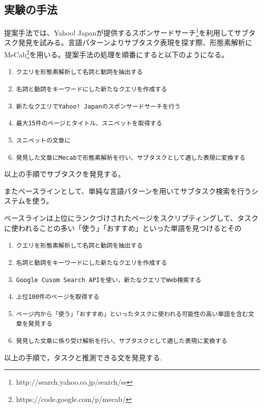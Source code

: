 \documentclass[submit,techreq]{ipsj}
\def\|{\verb|}
\begin{document}
\subsection{実験の手法}

提案手法では、Yahoo! Japanが提供するスポンサードサーチ\footnote{http://search.yahoo.co.jp/search/ss}を利用してサブタスク発見を試みる。言語パターンよりサブタスク表現を探す際、形態素解析にMeCab\footnote{https://code.google.com/p/mecab/}を用いる。提案手法の処理を順番にすると以下のようになる。

\begin{enumerate}
\item \|クエリを形態素解析して名詞と動詞を抽出する|
\item \|名詞と動詞をキーワードにした新たなクエリを作成する|
\item \|新たなクエリでYahoo! Japanのスポンサードサーチを行う|
\item \|最大15件のページとタイトル、スニペットを取得する|
\item \|スニペットの文章に|
\item \|発見した文章にMecabで形態素解析を行い、サブタスクとして適した表現に変換する|
\end{enumerate}

以上の手順でサブタスクを発見する。

またベースラインとして、単純な言語パターンを用いてサブタスク検索を行うシステムを使う。

ベースラインは上位にランクづけされたページをスクリプティングして、タスクに使われることの多い「使う」「おすすめ」といった単語を見つけるとその

\begin{enumerate}
\item \|クエリを形態素解析して名詞と動詞を抽出する|
\item \|名詞と動詞をキーワードにした新たなクエリを作成する|
\item \|Google Cusom Search APIを使い，新たなクエリでWeb検索する|
\item \|上位100件のページを取得する|
\item \|ページ内から「使う」「おすすめ」といったタスクに使われる可能性の高い単語を含む文章を発見する|
\item \|発見した文章に係り受け解析を行い、サブタスクとして適した表現に変換する|

\end{enumerate}

以上の手順で，タスクと推測できる文を発見する.
\end{document}
